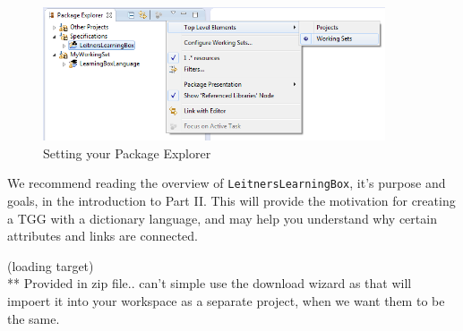 \begin{itemize}
\vspace{0.5cm}

\begin{figure}[htbp]
	\centering
  \includegraphics[width=0.9\textwidth]{eclipse_workingSets}
	\caption{Setting your Package Explorer}
	\label{fig:workingSets}
\end{figure}

We recommend reading the overview of \texttt{LeitnersLearningBox}, it's purpose and goals, in the introduction to Part II. This will provide the
motivation for creating a TGG with a dictionary language, and may help you understand why certain attributes and links are connected.

\end{itemize}

(loading target)\\
** Provided in zip file.. can't simple use the download wizard as that will impoert it into your workspace as a separate project, when we want them to be the
same.




